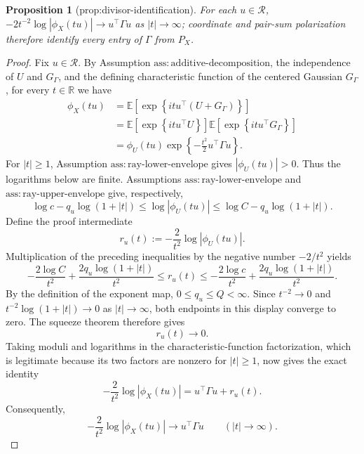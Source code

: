 \documentclass{article}
\newtheorem{proposition}{Proposition}
\begin{document}
\begin{proposition}[prop:divisor-identification]\label{prop:divisor-identification}
For each \(u\in\mathcal R\), \(-2t^{-2}\log|\phi_X(tu)|\to u^\top\Gamma u\) as \(|t|\to\infty\); coordinate and pair-sum polarization therefore identify every entry of \(\Gamma\) from \(P_X\).
\end{proposition}
\begin{proof}
Fix \(u\in\mathcal R\).  By Assumption \(\mathrm{ass{:}additive\mbox{-}decomposition}\), the independence of \(U\) and \(G_\Gamma\), and the defining characteristic function of the centered Gaussian \(G_\Gamma\), for every \(t\in\mathbb R\) we have
\[
\begin{aligned}
\phi_X(tu)
&=\mathbb E\!\left[\exp\!\left\{it u^\top(U+G_\Gamma)\right\}\right]\\
&=\mathbb E\!\left[\exp\!\left\{it u^\top U\right\}\right]
  \mathbb E\!\left[\exp\!\left\{it u^\top G_\Gamma\right\}\right]\\
&=\phi_U(tu)\exp\!\left\{-\frac{t^2}{2}u^\top\Gamma u\right\}.
\end{aligned}
\]
For \(|t|\geq 1\), Assumption \(\mathrm{ass{:}ray\mbox{-}lower\mbox{-}envelope}\) gives \(|\phi_U(tu)|>0\).  Thus the logarithms below are finite.  Assumptions \(\mathrm{ass{:}ray\mbox{-}lower\mbox{-}envelope}\) and \(\mathrm{ass{:}ray\mbox{-}upper\mbox{-}envelope}\) give, respectively,
\[
\log c-q_u\log(1+|t|)
\leq \log|\phi_U(tu)|
\leq \log C-q_u\log(1+|t|).
\]
Define the proof intermediate
\[
r_u(t):=-\frac{2}{t^2}\log|\phi_U(tu)|.
\]
Multiplication of the preceding inequalities by the negative number \(-2/t^2\) yields
\[
-\frac{2\log C}{t^2}
+\frac{2q_u\log(1+|t|)}{t^2}
\leq r_u(t)
\leq
-\frac{2\log c}{t^2}
+\frac{2q_u\log(1+|t|)}{t^2}.
\]
By the definition of the exponent map, \(0\leq q_u\leq Q<\infty\).  Since \(t^{-2}\to0\) and \(t^{-2}\log(1+|t|)\to0\) as \(|t|\to\infty\), both endpoints in this display converge to zero.  The squeeze theorem therefore gives
\[
r_u(t)\longrightarrow0.
\]
Taking moduli and logarithms in the characteristic-function factorization, which is legitimate because its two factors are nonzero for \(|t|\geq1\), now gives the exact identity
\[
-\frac{2}{t^2}\log|\phi_X(tu)|
=u^\top\Gamma u+r_u(t).
\]
Consequently,
\[
-\frac{2}{t^2}\log|\phi_X(tu)|
\longrightarrow u^\top\Gamma u
\qquad (|t|\to\infty).
\]


\end{proof}
\end{document}

